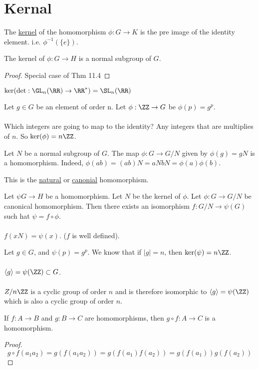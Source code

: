 \documentclass[class=scrartcl, crop=false]{standalone}
\begin{document}
\section{Kernal}

\begin{definition}
  The \ul{kernel} of the homomorphism $\phi:G \to K$ is the pre image of the identity element. i.e. $\phi^{-1}(\{e\})$.
\end{definition}

\begin{theorem}
  The kernel of $\phi:G \to H$ is a normal subgroup of $G$.
  \begin{proof}
    Special case of Thm 11.4
  \end{proof}
\end{theorem}

\begin{example}
  $\ker(\det:\GL_n(\RR) \to \RR^*) = \SL_n(\RR)$
\end{example}
\begin{example}
  Let $g \in G$ be an element of order n. Let $\phi:\ZZ \to G$ be $\phi(p) = g^p$.
  \\\\
  Which integers are going to map to the identity? Any integers that are multiplies of $n$. So $\ker(\phi) = n\ZZ$.
\end{example}
\begin{example}
  Let $N$ be a normal subgroup of $G$. The map $\phi: G \to G / N$ given by $\phi(g) = gN$ is a homomorphism. Indeed, $\phi(ab) = (ab)N = aNbN = \phi(a)\phi(b)$.
  \begin{note}
    This is the \ul{natural} or \ul{canonial} homomorphism.
  \end{note}
\end{example}

\begin{theorem}
  Let $\psi G \to H$ be a homomorphism. Let $N$ be the kernel of $\phi$. Let $\phi:G \to G / N$ be canonical homomorphism. Then there exists an isomorphism $f:G / N \to \psi(G)$ such hat $\psi = f \circ \phi$.
  \\\\
  $f(xN) = \psi(x)$. ($f$ is well defined).
  \begin{example}
    Let $g \in G$, and $\psi(p) = g^p$. We know that if $|g| = n$, then $\ker(\psi) = n\ZZ$.
    \\\\
    $\langle g \rangle = \psi(\ZZ) \subset G$.
    \\\\
    $Z / n\ZZ$ is a cyclic group of order $n$ and is therefore isomorphic to $\langle g \rangle = \psi(\ZZ)$ which is also a cyclic group of order $n$.
  \end{example}
\end{theorem}
\begin{lemma}
  If $f:A \to B$ and $g:B \to C$ are homomorphisms, then $g\circ f:A \to C$ is a homomorphism.
  \begin{proof}
    \[
      g \circ f (a_1 a_2) = g(f(a_1 a_2)) = g(f(a_1)f(a_2)) = g(f(a_1))g(f(a_2))
    \]
  \end{proof}
\end{lemma}
\end{document}
